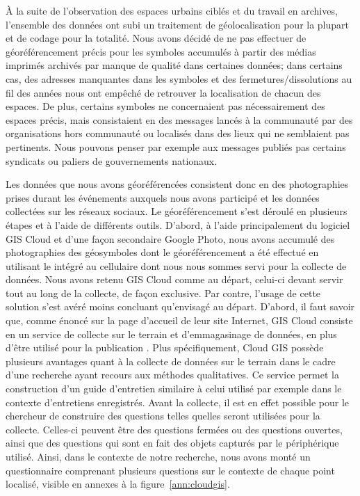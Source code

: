 À la suite de l'observation des espaces urbains ciblés et du travail en archives, l'ensemble des données ont subi un traitement de géolocalisation pour la plupart et de codage pour la totalité.
Nous avons décidé de ne pas effectuer de géoréférencement précis pour les symboles accumulés à partir des médias imprimés archivés par manque de qualité dans certaines données; dans certains cas, des adresses manquantes dans les symboles et des fermetures/dissolutions au fil des années nous ont empêché de retrouver la localisation de chacun des espaces.
De plus, certains symboles ne concernaient pas nécessairement des espaces précis, mais consistaient en des messages lancés à la communauté par des organisations hors communauté ou localisés dans des lieux qui ne semblaient pas  pertinents.
Nous pouvons penser par exemple aux messages publiés pas certains syndicats ou paliers de gouvernements nationaux.

Les données que nous avons géoréférencées consistent donc en des photographies prises durant les événements \lgbt{} auxquels nous avons participé et les données collectées sur les réseaux sociaux.
Le géoréférencement s'est déroulé en plusieurs étapes et à l'aide de différents outils.
D'abord, à l'aide principalement du logiciel GIS Cloud et d'une façon secondaire Google Photo, nous avons accumulé des photographies des géosymboles dont le géoréférencement a été effectué en utilisant le \gps{} intégré au cellulaire dont nous nous sommes servi pour la collecte de données.
Nous avons retenu GIS Cloud comme au départ, celui-ci devant servir tout au long de la collecte, de façon exclusive.
Par contre, l'usage de cette solution s'est avéré moins concluant qu'envisagé au départ.
D'abord, il faut savoir que, comme énoncé sur la page d'accueil de leur site Internet, GIS Cloud consiste en un service de collecte sur le terrain et d’emmagasinage de données, en plus d'être utilisé pour la publication \citep{GISCloud2014}.
Plus spécifiquement, Cloud GIS possède plusieurs avantages quant à la collecte de données sur le terrain dans le cadre d'une recherche ayant recours aux méthodes qualitatives.
Ce service permet la construction d'un guide d'entretien similaire à celui utilisé par exemple dans le contexte d'entretiens enregistrés.
Avant la collecte, il est en effet possible pour le chercheur de construire des questions telles quelles seront utilisées pour la collecte.
Celles-ci peuvent être des questions fermées ou des questions ouvertes, ainsi que des questions qui sont en fait des objets capturés par le périphérique utilisé.
Ainsi, dans le contexte de notre recherche, nous avons monté un questionnaire comprenant plusieurs questions sur le contexte de chaque point localisé, visible en annexes à la figure~\ref{ann:cloudgis}.

